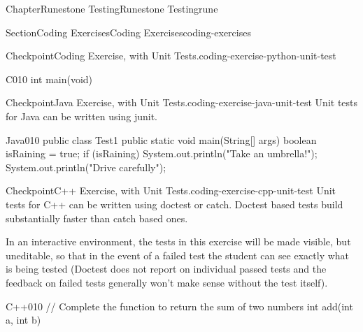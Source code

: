\documentclass[oneside,10pt,]{book}
\numberwithin{equation}{section}
\begin{document}
\begin{chapterptx}{Chapter}{Runestone Testing}{}{Runestone Testing}{}{}{rune}
\begin{sectionptx}{Section}{Coding Exercises}{}{Coding Exercises}{}{}{coding-exercises}
\begin{inlineexercise}{Checkpoint}{Coding Exercise, with Unit Tests.}{coding-exercise-python-unit-test}
\begin{program}{C}{0}{1}{0}
int main(void)
\end{program}
\end{inlineexercise}%
\begin{inlineexercise}{Checkpoint}{Java Exercise, with Unit Tests.}{coding-exercise-java-unit-test}%
Unit tests for Java can be written using junit.%
\begin{program}{Java}{0}{1}{0}
public class Test1
{
    public static void main(String[] args)
    {
        boolean isRaining = true;
        if (isRaining)
        {
            System.out.println("Take an umbrella!");
        }
        System.out.println("Drive carefully");
    }
}
\end{program}
\end{inlineexercise}%
\begin{inlineexercise}{Checkpoint}{C++ Exercise, with Unit Tests.}{coding-exercise-cpp-unit-test}%
Unit tests for C++ can be written using doctest or catch. Doctest based tests build substantially faster than catch based ones.%
\par
In an interactive environment, the tests in this exercise will be made visible, but uneditable, so that in the event of a failed test the student can see exactly what is being tested (Doctest does not report on individual passed tests and the feedback on failed tests generally won't make sense without the test itself).%
\begin{program}{C++}{0}{1}{0}
// Complete the function to return the sum of two numbers
int add(int a, int b) {

}
\end{program}
\end{inlineexercise}
\end{sectionptx}
\end{chapterptx}
\end{document}
